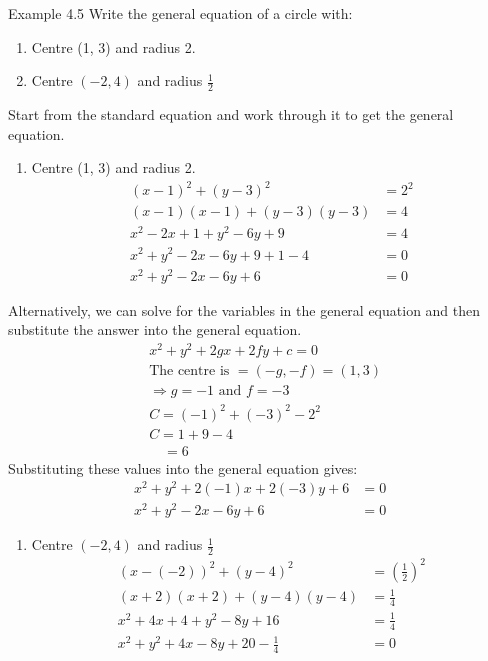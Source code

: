 \begin{example}{Example 4.5}
Write the general equation of a circle with:
\begin{enumerate}
  \item[a.] Centre (1, 3) and radius 2.
  \item[b.] Centre $(-2, 4)$ and radius $\frac{1}{2}$
\end{enumerate}

\solution
Start from the standard equation and work through it to get the general equation.
\begin{enumerate}
  \item[a.] Centre (1, 3) and radius 2.
  \begin{align*}
  (x - 1)^2 + (y - 3)^2 &= 2^2 \\
  (x - 1)(x - 1) + (y - 3)(y - 3) &= 4 \\
  x^2 - 2x + 1 + y^2 - 6y + 9 &= 4 \\
  x^2 + y^2 - 2x - 6y + 9 + 1 - 4 &= 0 \\
  x^2 + y^2 - 2x - 6y + 6 &= 0
  \end{align*}
\end{enumerate}
Alternatively, we can solve for the variables in the general equation and then
substitute the answer into the general equation.
\begin{align*}
&x^2 + y^2 + 2gx + 2fy + c = 0 \\
&\text{The centre is } = (-g, -f) = (1, 3) \\
&\Longrightarrow g = -1 \text{ and } f = -3 \\
&C = (-1)^2 + (-3)^2 - 2^2 \\
&C = 1 + 9 - 4 \\
&\quad = 6
\end{align*}
Substituting these values into the general equation gives:
\begin{align*}
x^2 + y^2 + 2(-1)x + 2(-3)y + 6 &= 0 \\
x^2 + y^2 - 2x - 6y + 6 &= 0
\end{align*}
\begin{enumerate}
  \item[b.] Centre $(-2, 4)$ and radius $\frac{1}{2}$
  \begin{align*}
  (x - (-2))^2 + (y - 4)^2 &= \left(\frac{1}{2}\right)^2 \\
  (x + 2)(x + 2) + (y - 4)(y - 4) &= \frac{1}{4} \\
  x^2 + 4x + 4 + y^2 - 8y + 16 &= \frac{1}{4} \\
  x^2 + y^2 + 4x - 8y + 20 - \frac{1}{4} &= 0 \\

\end{align*}
\end{enumerate}
\end{example}
